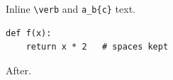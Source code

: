 \documentclass{article}
\begin{document}
Inline \verb|\verb| and \verb+a_b{c}+ text.
\begin{verbatim}
def f(x):
    return x * 2   # spaces kept
\end{verbatim}
After.
\end{document}
